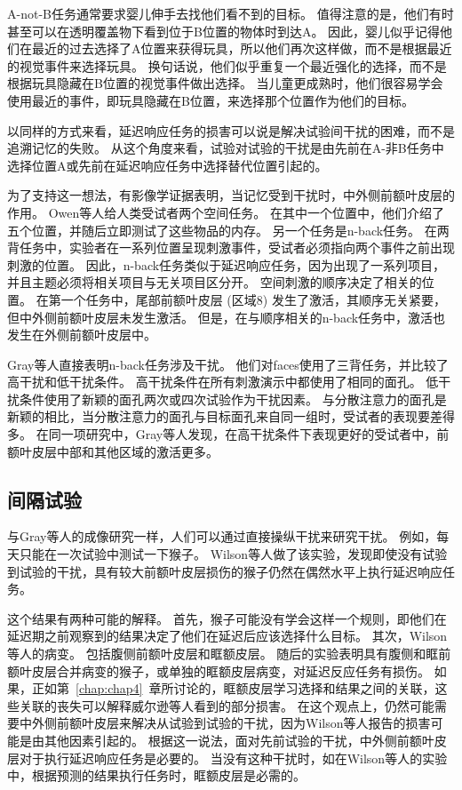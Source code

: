 A-not-B任务通常要求婴儿伸手去找他们看不到的目标。
值得注意的是，他们有时甚至可以在透明覆盖物下看到位于B位置的物体时到达A\cite{butterworth1977object}。
因此，婴儿似乎记得他们在最近的过去选择了A位置来获得玩具，所以他们再次这样做，而不是根据最近的视觉事件来选择玩具。
换句话说，他们似乎重复一个最近强化的选择，而不是根据玩具隐藏在B位置的视觉事件做出选择。
当儿童更成熟时，他们很容易学会使用最近的事件，即玩具隐藏在B位置，来选择那个位置作为他们的目标。


以同样的方式来看，延迟响应任务的损害可以说是解决试验间干扰的困难，而不是追溯记忆的失败。
从这个角度来看，试验对试验的干扰是由先前在A-非B任务中选择位置A或先前在延迟响应任务中选择替代位置引起的。


为了支持这一想法，有影像学证据表明，当记忆受到干扰时，中外侧前额叶皮层的作用。
Owen等人\cite{owen1999redefining}给人类受试者两个空间任务。
在其中一个位置中，他们介绍了五个位置，并随后立即测试了这些物品的内存。
另一个任务是n-back任务。
在两背任务中，实验者在一系列位置呈现刺激事件，受试者必须指向两个事件之前出现刺激的位置。
因此，n-back任务类似于延迟响应任务，因为出现了一系列项目，并且主题必须将相关项目与无关项目区分开。
空间刺激的顺序决定了相关的位置。
在第一个任务中，尾部前额叶皮层 (区域8) 发生了激活，其顺序无关紧要，但中外侧前额叶皮层未发生激活。
但是，在与顺序相关的n-back任务中，激活也发生在外侧前额叶皮层中。


Gray等人\cite{gray2003neural}直接表明n-back任务涉及干扰。
他们对faces使用了三背任务，并比较了高干扰和低干扰条件。
高干扰条件在所有刺激演示中都使用了相同的面孔。
低干扰条件使用了新颖的面孔两次或四次试验作为干扰因素。
与分散注意力的面孔是新颖的相比，当分散注意力的面孔与目标面孔来自同一组时，受试者的表现要差得多。
在同一项研究中，Gray等人发现，在高干扰条件下表现更好的受试者中，前额叶皮层中部和其他区域的激活更多。



\subsection{间隔试验}

与Gray等人\cite{gray2003neural}的成像研究一样，人们可以通过直接操纵干扰来研究干扰。
例如，每天只能在一次试验中测试一下猴子。
Wilson等人\cite{wilson1963effect}做了该实验，发现即使没有试验到试验的干扰，具有较大前额叶皮层损伤的猴子仍然在偶然水平上执行延迟响应任务。


这个结果有两种可能的解释。
首先，猴子可能没有学会这样一个规则，即他们在延迟期之前观察到的结果决定了他们在延迟后应该选择什么目标。
其次，Wilson等人的病变。
包括腹侧前额叶皮层和眶额皮层。
随后的实验表明具有腹侧和眶前额叶皮层合并病变的猴子\cite{passingham1971behavioural}，或单独的眶额皮层病变\cite{meunier1997effects}，对延迟反应任务有损伤。
如果，正如第~\ref{chap:chap4}~章所讨论的，眶额皮层学习选择和结果之间的关联，这些关联的丧失可以解释威尔逊等人看到的部分损害。
在这个观点上，仍然可能需要中外侧前额叶皮层来解决从试验到试验的干扰，因为Wilson等人报告的损害可能是由其他因素引起的。
根据这一说法，面对先前试验的干扰，中外侧前额叶皮层对于执行延迟响应任务是必要的。
当没有这种干扰时，如在Wilson等人的实验中，根据预测的结果执行任务时，眶额皮层是必需的。




